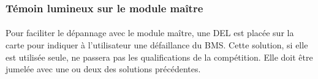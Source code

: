 	\subsubsection{Témoin lumineux sur le module maître}
		\paragraph*{}
		Pour faciliter le dépannage avec le module maître, une DEL est placée sur la carte pour indiquer à l'utilisateur une défaillance du BMS. Cette solution, si elle est utilisée seule, ne passera pas les qualifications de la compétition. Elle doit être jumelée avec une ou deux des solutions précédentes.

